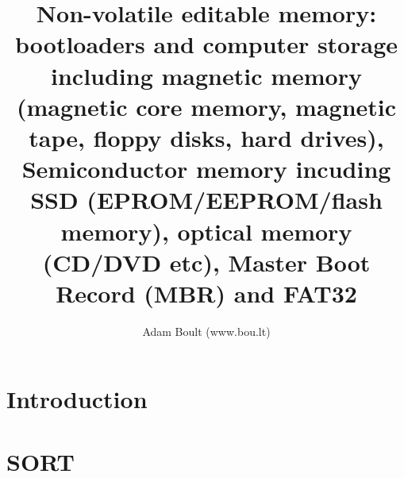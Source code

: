 \documentclass[oneside]{book}
\begin{document}
\author{Adam Boult (www.bou.lt)}
\title{Non-volatile editable memory: bootloaders and computer storage including magnetic memory (magnetic core memory, magnetic tape, floppy disks, hard drives), Semiconductor memory incuding SSD (EPROM/EEPROM/flash memory), optical memory (CD/DVD etc), Master Boot Record (MBR) and FAT32}
\maketitle

\setcounter{tocdepth}{0}
\tableofcontents



\part{Introduction}





\part{SORT}

\end{document}
